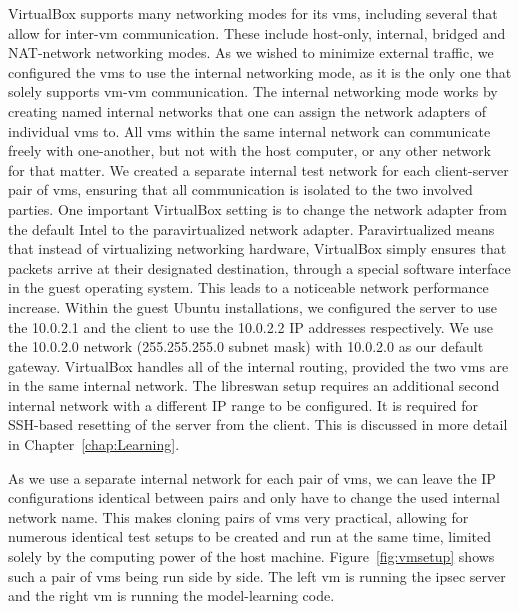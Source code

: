 VirtualBox supports many networking modes for its \acp{vm}, including several that allow for inter-\ac{vm} communication. These include host-only, internal, bridged and NAT-network networking modes.
As we wished to minimize external traffic, we configured the \acp{vm} to use the internal networking mode, as it is the only one that solely supports \ac{vm}-\ac{vm} communication.
The internal networking mode works by creating named internal networks that one can assign the network adapters of individual \acp{vm} to. All \acp{vm} within the same internal network can communicate freely with one-another, but not with the host computer, or any other network for that matter. We created a separate internal test network for each client-server pair of \acp{vm}, ensuring that all communication is isolated to the two involved parties. One important VirtualBox setting is to change the network adapter from the default Intel to the paravirtualized network adapter. Paravirtualized means that instead of virtualizing networking hardware, VirtualBox simply ensures that packets arrive at their designated destination, through a special software interface in the guest operating system. This leads to a noticeable network performance increase. Within the guest Ubuntu installations, we configured the server to use the 10.0.2.1 and the client to use the 10.0.2.2 IP addresses respectively. We use the 10.0.2.0 network (255.255.255.0 subnet mask) with 10.0.2.0 as our default gateway. VirtualBox handles all of the internal routing, provided the two \acp{vm} are in the same internal network. The libreswan setup requires an additional second internal network with a different IP range to be configured. It is required for SSH-based resetting of the server from the client. This is discussed in more detail in Chapter~\ref{chap:Learning}.

As we use a separate internal network for each pair of \acp{vm}, we can leave the IP configurations identical between pairs and only have to change the used internal network name. This makes cloning pairs of \acp{vm} very practical, allowing for numerous identical test setups to be created and run at the same time, limited solely by the computing power of the host machine. Figure~\ref{fig:vmsetup} shows such a pair of \acp{vm} being run side by side. The left \ac{vm} is running the \ac{ipsec} server and the right \ac{vm} is running the model-learning code.

